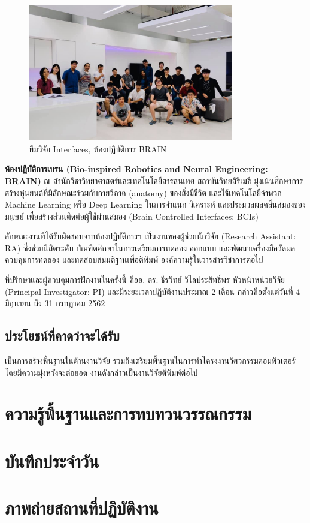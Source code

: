 \documentclass[16pt,a4]{internshipreport}
\begin{document}
\begin{figure}[H]
    \centering
    \includegraphics[width=0.8\textwidth]{images/brain_team_2019.jpg}
    \caption{ทีมวิจัย Interfaces, ห้องปฏิบัติการ BRAIN}
\end{figure}

\textbf{ห้องปฏิบัติการเบรน (Bio-inspired Robotics and Neural Engineering: BRAIN)}
ณ สำนักวิชาวิทยาศาสตร์และเทคโนโลยีสารสนเทศ สถาบันวิทยสิริเมธี มุ่งเน้นศึกษาการสร้างหุ่นยนต์ที่มีลักษณะร่วมกับกายวิภาค
(anatomy) ของสิ่งมีชีวิต และใช้เทคโนโลยีจำพวก Machine Learning หรือ Deep Learning ในการจำแนก วิเคราะห์
และประมวลผลคลื่นสมองของมนุษย์ เพื่อสร้างส่วนติดต่อผู้ใช้ผ่านสมอง (Brain Controlled Interfaces: BCIs)

ลักษณะงานที่ได้รับผิดชอบจากห้องปฏิบัติการฯ เป็นงานของผู้ช่วยนักวิจัย (Research Assistant: RA) ซึ่งช่วยนิสิตระดับ
บัณฑิตศึกษาในการเตรียมการทดลอง ออกแบบ และพัฒนาเครื่องมือวัดผล ควบคุมการทดลอง และทดสอบสมมติฐานเพื่อตีพิมพ์
องค์ความรู้ในวารสารวิชาการต่อไป

ที่ปรึกษาและผู้ควบคุมการฝึกงานในครั้งนี้ คืออ. ดร. ธีรวิทย์ วิไลประสิทธิ์พร หัวหน้าหน่วยวิจัย (Principal Investigator: PI)
และมีระยะเวลาปฏิบัติงานประมาณ 2 เดือน กล่าวคือตั้งแต่วันที่ 4 มิถุนายน ถึง 31 กรกฎาคม 2562

\section{ประโยชน์ที่คาดว่าจะได้รับ}
เป็นการสร้างพื้นฐานในด้านงานวิจัย รวมถึงเตรียมพื้นฐานในการทำโครงงานวิศวกรรมคอมพิวเตอร์ โดยมีความมุ่งหวังจะต่อยอด
งานดังกล่าวเป็นงานวิจัยตีพิมพ์ต่อไป

\chapter{ความรู้พื้นฐานและการทบทวนวรรณกรรม}




\begin{appendices}
\chapter{บันทึกประจำวัน}


\chapter{ภาพถ่ายสถานที่ปฏิบัติงาน}

\end{appendices}
\end{document}
